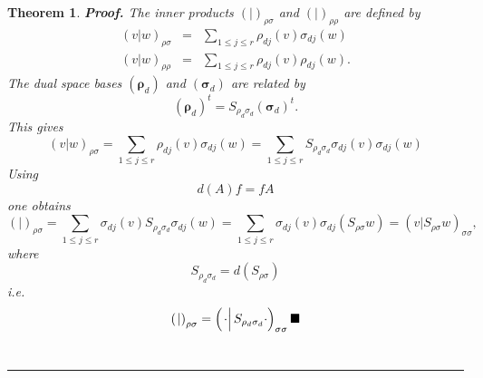 \documentclass[aps,preprint]{revtex4}
\newtheorem{theorem}{Theorem}
\newenvironment{proof}[1][Proof]{\noindent\textbf{#1.} }{\ \rule{0.5em}{0.5em}}
\begin{document}
\begin{theorem}
\begin{proof}
The inner products $\left( \left. {}\right\vert \right) _{\rho \sigma }$ and 
$\left( \left. {}\right\vert \right) _{\rho \rho }$ are defined by 
\begin{eqnarray}
\left( \left. v\right\vert w\right) _{\rho \sigma } &=&\sum_{1\leq j\leq
r}\rho _{dj}\left( v\right) \sigma _{dj}\left( w\right) \\
\left( \left. v\right\vert w\right) _{\rho \rho } &=&\sum_{1\leq j\leq
r}\rho _{dj}\left( v\right) \rho _{dj}\left( w\right) .
\end{eqnarray}%
The dual space bases $\left( \boldsymbol{\rho }_{d}\right) $ and $\left( 
\boldsymbol{\sigma }_{d}\right) $ are related by 
\begin{equation}
\left( \boldsymbol{\rho }_{d}\right) ^{t}=S_{\rho _{d}\sigma _{d}}\left( 
\boldsymbol{\sigma }_{d}\right) ^{t}.
\end{equation}%
This gives 
\begin{equation}
\left( \left. v\right\vert w\right) _{\rho \sigma }=\sum_{1\leq j\leq r}\rho
_{dj}\left( v\right) \sigma _{dj}\left( w\right) =\sum_{1\leq j\leq
r}S_{\rho _{d}\sigma _{d}}\sigma _{dj}\left( v\right) \sigma _{dj}\left(
w\right)
\end{equation}%
Using 
\begin{equation}
d\left( A\right) f=fA
\end{equation}%
one obtains 
\begin{equation}
\left( \left. {}\right\vert \right) _{\rho \sigma }=\sum_{1\leq j\leq
r}\sigma _{dj}\left( v\right) S_{\rho _{d}\sigma _{d}}\sigma _{dj}\left(
w\right) =\sum_{1\leq j\leq r}\sigma _{dj}\left( v\right) \sigma _{dj}\left(
S_{\rho \sigma }w\right) =\left( \left. v\right\vert S_{\rho \sigma
}w\right) _{\sigma \sigma },
\end{equation}%
where 
\begin{equation}
S_{\rho _{d}\sigma _{d}}=d\left( S_{\rho \sigma }\right)
\end{equation}%
i.e. 
\begin{equation}
\left( \left. {}\right\vert \right) _{\rho \sigma }=\left( \left. \overset{%
\overset{}{}}{\cdot }\right\vert \overset{}{S_{\rho _{d}\sigma _{d}}}\cdot
\right) _{\sigma \sigma }\blacksquare
\end{equation}
\end{proof}
\end{theorem}
\end{document}
